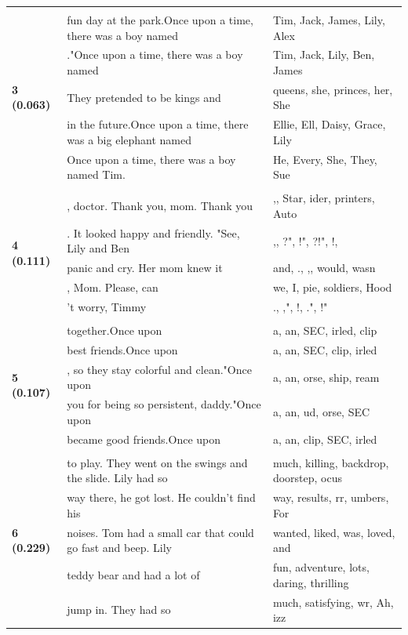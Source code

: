 \documentclass{article}
\theoremstyle{plain}
\theoremstyle{definition}
\theoremstyle{remark}
\begin{document}
\begin{longtable}{|p{}|p{}|p{}|}
& & \\
\multirow{5}{*}{\textbf{3 (0.063)}} & fun day at the park.Once upon a time, there was a boy named & Tim,  Jack,  James,  Lily,  Alex \\
& ."Once upon a time, there was a boy named & Tim,  Jack,  Lily,  Ben,  James \\
& They pretended to be kings and & queens,  she,  princes,  her,  She \\
& in the future.Once upon a time, there was a big elephant named & Ellie,  Ell,  Daisy,  Grace,  Lily \\
& Once upon a time, there was a boy named Tim. & He,  Every,  She,  They,  Sue \\
& & \\
\multirow{5}{*}{\textbf{4 (0.111)}} & , doctor. Thank you, mom. Thank you & ,,  Star, ider,  printers,  Auto \\
& . It looked happy and friendly.  "See, Lily and Ben & ,, ?", !", ?!", !, \\
& panic and cry. Her mom knew it & and, ., ,,  would,  wasn \\
& , Mom. Please, can & we,  I,  pie,  soldiers,  Hood \\
& 't worry, Timmy & ., ,", !, .", !" \\
& & \\
\multirow{5}{*}{\textbf{5 (0.107)}} & together.Once upon & a,  an, SEC, irled, clip \\
& best friends.Once upon & a,  an, SEC, clip, irled \\
& , so they stay colorful and clean."Once upon & a,  an, orse, ship, ream \\
& you for being so persistent, daddy."Once upon & a,  an, ud, orse, SEC \\
& became good friends.Once upon & a,  an, clip, SEC, irled \\
& & \\
\multirow{5}{*}{\textbf{6 (0.229)}} & to play. They went on the swings and the slide. Lily had so & much,  killing,  backdrop,  doorstep, ocus \\
& way there, he got lost. He couldn't find his & way,  results, rr, umbers, For \\
& noises. Tom had a small car that could go fast and beep. Lily & wanted,  liked,  was,  loved,  and \\
& teddy bear and had a lot of & fun,  adventure,  lots,  daring,  thrilling \\
& jump in. They had so & much,  satisfying, wr, Ah, izz \\

\end{longtable}
\end{document}
